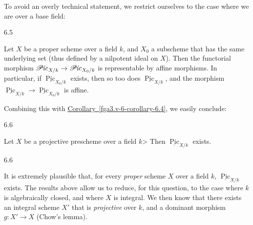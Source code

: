   To avoid an overly technical statement, we restrict ourselves to the case where we are over a base field:\begin{proposition}{6.5}\label{fga3.v-6-proposition-6.5}\skipsinglepar\par{}Let \(X\) be a proper scheme over a field \(k\), and \(X_0\) a subscheme that has the same underlying set (thus defined by a nilpotent ideal on \(X\)).
    Then the functorial morphism \(\mathscr {P}\kern  -1pt\mathit {ic}_{X/k}\to \mathscr {P}\kern  -1pt\mathit {ic}_{X_0/k}\) is representable by affine morphisms.
    In particular, if \(\underline {\operatorname {Pic}}_{X_0/k}\) exists, then so too does \(\underline {\operatorname {Pic}}_{X/k}\), and the morphism \(\underline {\operatorname {Pic}}_{X/k}\to \underline {\operatorname {Pic}}_{X_0/k}\) is affine.\end{proposition}\par{}Combining this with \hyperref[fga3.v-6-corollary-6.4]{Corollary~\ref*{fga3.v-6-corollary-6.4}}, we easily conclude:\begin{corollary}{6.6}\label{fga3.v-6-corollary-6.6}\skipsinglepar\par{}Let \(X\) be a projective prescheme over a field \(k\)>
    Then \(\underline {\operatorname {Pic}}_{X/k}\) exists.\end{corollary}\begin{remark}{6.6}\label{fga3.v-6-remark-6.6}\skipsinglepar\par{}It is extremely plausible that, for every \emph{proper} scheme \(X\) over a field \(k\), \(\underline {\operatorname {Pic}}_{X/k}\) exists.
    The results above allow us to reduce, for this question, to the case where \(k\) is algebraically closed, and where \(X\) is integral.
    We then know that there exists an integral scheme \(X'\) that is \emph{projective} over \(k\), and a dominant morphism \(g\colon  X'\to  X\) (Chow's lemma).
    

\end{remark}
